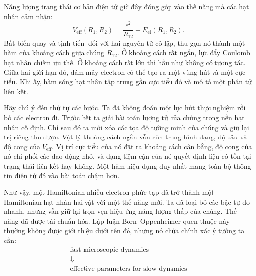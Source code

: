 \begin{classroomqa}
\end{classroomqa}

Năng lượng trạng thái cơ bản điện tử giờ đây đóng góp vào thế năng mà các hạt nhân cảm nhận:
\begin{equation}
V_{\mathrm{eff}}(R_1,R_2)
=\frac{e^2}{R_{12}}+E_{\mathrm{el}}(R_1,R_2).
\label{eq:molecular-effective-potential}
\end{equation}
Bất biến quay và tịnh tiến, đối với hai nguyên tử cô lập, thu gọn nó thành một hàm của khoảng cách giữa chúng \(R_{12}\). Ở khoảng cách rất ngắn, lực đẩy Coulomb hạt nhân chiếm ưu thế. Ở khoảng cách rất lớn thì hầu như không có tương tác. Giữa hai giới hạn đó, đám mây electron có thể tạo ra một vùng hút và một cực tiểu. Khi ấy, hàm sóng hạt nhân tập trung gần cực tiểu đó và mô tả một phân tử liên kết.

Hãy chú ý đến thứ tự các bước. Ta đã không đoán một lực hút thực nghiệm rồi bỏ các electron đi. Trước hết ta giải bài toán lượng tử của chúng trong nền hạt nhân cố định. Chỉ sau đó ta mới xóa các tọa độ tường minh của chúng và giữ lại trị riêng thu được. Vật lý khoảng cách ngắn vẫn còn trong hình dạng, độ sâu và độ cong của \(V_{\mathrm{eff}}\). Vị trí cực tiểu của nó đặt ra khoảng cách cân bằng, độ cong của nó chi phối các dao động nhỏ, và dạng tiệm cận của nó quyết định liệu có tồn tại trạng thái liên kết hay không. Một hàm hiệu dụng duy nhất mang toàn bộ thông tin điện tử đó vào bài toán chậm hơn.

Như vậy, một Hamiltonian nhiều electron phức tạp đã trở thành một Hamiltonian hạt nhân hai vật với một thế năng mới. Ta đã loại bỏ các bậc tự do nhanh, nhưng vẫn giữ lại trọn vẹn hiệu ứng năng lượng thấp của chúng. Thế năng đã được tái chuẩn hóa. Lập luận Born--Oppenheimer quen thuộc này thường không được giới thiệu dưới tên đó, nhưng nó chứa chính xác ý tưởng ta cần:
\begin{equation}
\begin{gathered}
\text{fast microscopic dynamics}\\
\Downarrow\\
\text{effective parameters for slow dynamics}
\end{gathered}
\end{equation}

